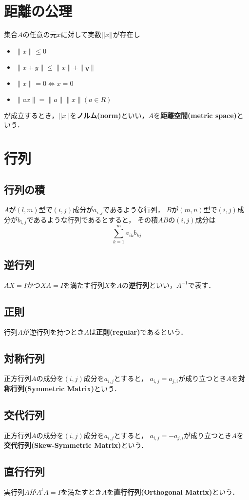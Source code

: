 \documentclass[11pt, a4paper]{jsarticle}
\begin{document}
\section {距離の公理}

集合$A$の任意の元$x$に対して実数$||x||$が存在し

\begin{itemize}
  \item $ \|x\| \leq 0 $
  \item $ \|x+y\| \leq \|x\| + \|y\| $
  \item $ \|x\| = 0 \Leftrightarrow x = 0 $
  \item $ \|ax\| = \|a\| \|x\| (a \in R) $
\end{itemize}

が成立するとき，$||x||$を\textbf{ノルム(norm)}といい，$A$を\textbf{距離空間(metric space)}という．

\section {行列}

\subsection{行列の積}

$A$が$(l, m)$型で$(i, j)$成分が$a_{i, j}$であるような行列，
$B$が$(m, n)$型で$(i, j)$成分が$b_{i, j}$であるような行列であるとすると，
その積$AB$の$(i, j)$成分は
$$
\sum_{k=1}^{m}a_{ik}b_{kj}
$$

\subsection{逆行列}
$AX = I$かつ$XA = I$を満たす行列$X$を$A$の\textbf{逆行列}といい，$A^{-1}$で表す．

\subsection{正則}
行列$A$が逆行列を持つとき$A$は\textbf{正則(regular)}であるという．

\subsection{対称行列}
正方行列$A$の成分を$(i, j)$成分を$a_{i, j}$とすると，
$a_{i, j} = a_{j, i}$が成り立つとき$A$を\textbf{対称行列(Symmetric Matrix)}という．

\subsection{交代行列}
正方行列$A$の成分を$(i, j)$成分を$a_{i, j}$とすると，
$a_{i, j} = -a_{j, i}$が成り立つとき$A$を\textbf{交代行列(Skew-Symmetric Matrix)}という．

\subsection{直行行列}
実行列$A$が$A^tA = I$を満たすとき$A$を\textbf{直行行列(Orthogonal Matrix)}という．
\end{document}
